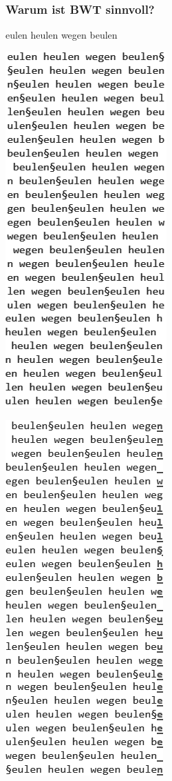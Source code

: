 \documentclass{beamer}
\begin{document}
\begin{frame}
    \frametitle{Warum ist BWT sinnvoll?}
    \begin{center}
        eulen heulen wegen beulen\pause
    \end{center}
    \begin{minipage}[t]{0.48\linewidth}
        \centering
        \includegraphics[height=0.725\textheight]{bwt/bwt_rots.png}
    \end{minipage}\pause
    \begin{minipage}[t]{0.48\linewidth}
        \centering
        \includegraphics[height=0.725\textheight]{bwt/bwt_sort.png}

\end{minipage}
\end{frame}
\end{document}
